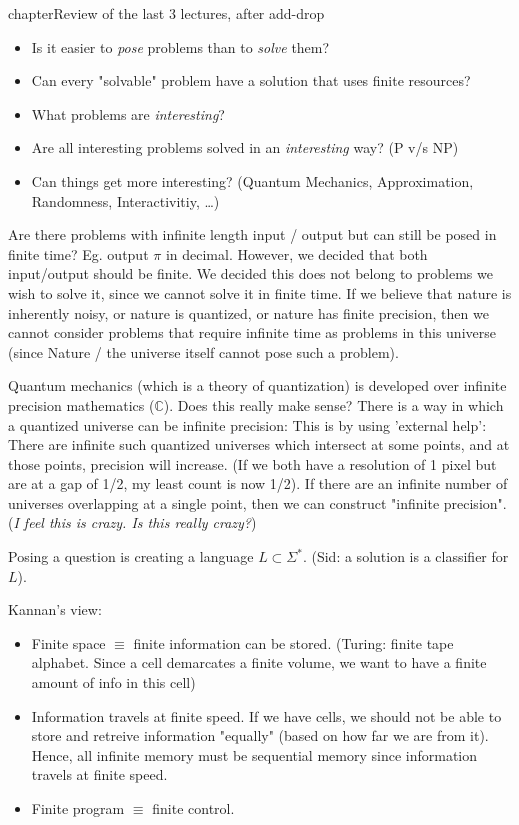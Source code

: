 chapter{Review of the last 3 lectures, after add-drop}

\begin{itemize}
    \item Is it easier to \textit{pose} problems than to \textit{solve} them?
    \item Can every "solvable" problem have a solution that uses finite
        resources?
    \item What problems are \textit{interesting}?
    \item Are all interesting problems solved in an \textit{interesting} way?
        (P v/s NP)
    \item Can things get more interesting? (Quantum Mechanics, Approximation,
        Randomness, Interactivitiy, \dots)
\end{itemize}

Are there problems with infinite length input / output but can still be
posed in finite time?  Eg. output $\pi$ in decimal. However, we decided that
both input/output should be finite. We decided this does not belong to problems
we wish to solve it, since we cannot solve it in finite time. If we believe
that nature is inherently noisy, or nature is quantized, or nature has finite
precision, then we cannot consider problems that require infinite time as
problems in this universe (since Nature / the universe itself cannot pose
such a problem).

Quantum mechanics (which is a theory of quantization) is developed over
infinite precision mathematics ($\mathbb{C}$). Does this really make sense?  
There is a way in which a quantized universe can be infinite precision: This
is by using 'external help': There are infinite such quantized universes which
intersect at some points, and at those points, precision will increase. 
(If we both have a resolution of 1 pixel but are at a gap of 1/2, my least
count is now 1/2). If there are an infinite number of universes overlapping
at a single point, then we can construct "infinite precision". 
(\textit{I feel this is crazy. Is this really crazy?})


Posing a question is creating a language $L \subset \Sigma^*$. (Sid: a solution
is a classifier for $L$). 

Kannan's view: 
\begin{itemize}
    \item Finite space $\equiv$ finite information can be stored.
        (Turing: finite tape alphabet. Since a cell demarcates a finite volume,
        we want to have a finite amount of info in this cell)
    \item Information travels at finite speed. If we have cells, we should not
        be able to store and retreive information "equally" (based on how far
        we are from it). Hence, all infinite memory must be sequential memory
        since information travels at finite speed.
    \item Finite program $\equiv$ finite control.
\end{itemize}

